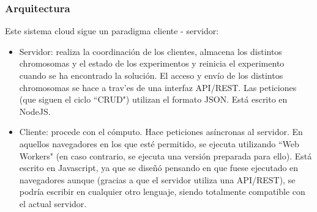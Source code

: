 \documentclass[runningheads,a4paper]{llncs}
\begin{document}
\subsubsection{Arquitectura}
Este sistema cloud sigue un paradigma cliente - servidor:
\begin{itemize}
  \item Servidor: realiza la coordinaci\'on de los clientes, almacena los distintos chromosomas y
  el estado de los experimentos y reinicia el experimento cuando se ha encontrado la soluci\'on.
  El acceso y env\'io de los distintos chromosomas se hace a trav'es de una interfaz API/REST.
  Las peticiones (que siguen el ciclo ``CRUD") utilizan el formato JSON. Est\'a escrito en NodeJS.
  \item Cliente: procede con el c\'omputo. Hace peticiones as\'incronas al servidor.
  En aquellos navegadores en los que est\'e permitido, se ejecuta utilizando ``Web Workers"
  (en caso contrario, se ejecuta una versi\'on preparada para ello). Est\'a escrito
  en Javascript, ya que se dise\~n\'o pensando en que fuese ejecutado en navegadores aunque
  (gracias a que el servidor utiliza una API/REST), se podr\'ia escribir en cualquier otro
  lenguaje, siendo totalmente compatible con el actual servidor.
\end{itemize}
\end{document}
